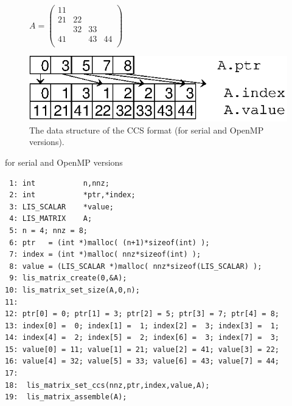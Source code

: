 \documentclass[a4paper]{article}
\begin{document}
\begin{figure}[h]
{\centering 
\begin{minipage}{0.3\textwidth}
\begin{flushright}
$ 
A = \left(
\begin{array}{cccc}
11 &    &    &    \\
21 & 22 &    &    \\
   & 32 & 33 &    \\
41 &    & 43 & 44 \\
\end{array}\right)
$
\end{flushright}
\end{minipage}
\begin{minipage}{0.6\textwidth}
\begin{flushleft}
\includegraphics{storage02.eps} 
\end{flushleft}
\end{minipage}
\caption{The data structure of the CCS format (for serial and OpenMP versions).}\label{fig:storage02}}
\end{figure}
\begin{itembox}[l]{for serial and OpenMP versions}
\small
\begin{verbatim}
 1: int           n,nnz;
 2: int           *ptr,*index;
 3: LIS_SCALAR    *value;
 4: LIS_MATRIX    A;
 5: n = 4; nnz = 8;
 6: ptr   = (int *)malloc( (n+1)*sizeof(int) );
 7: index = (int *)malloc( nnz*sizeof(int) );
 8: value = (LIS_SCALAR *)malloc( nnz*sizeof(LIS_SCALAR) );
 9: lis_matrix_create(0,&A);
10: lis_matrix_set_size(A,0,n);
11:
12: ptr[0] = 0; ptr[1] = 3; ptr[2] = 5; ptr[3] = 7; ptr[4] = 8;
13: index[0] =  0; index[1] =  1; index[2] =  3; index[3] =  1;
14: index[4] =  2; index[5] =  2; index[6] =  3; index[7] =  3;
15: value[0] = 11; value[1] = 21; value[2] = 41; value[3] = 22;
16: value[4] = 32; value[5] = 33; value[6] = 43; value[7] = 44;
17:
18:  lis_matrix_set_ccs(nnz,ptr,index,value,A);
19:  lis_matrix_assemble(A);
\end{verbatim}
\end{itembox}
\newpage
\end{document}
